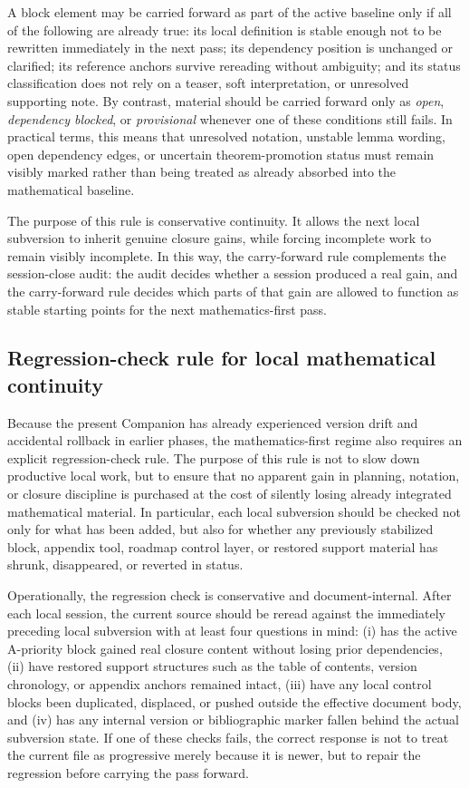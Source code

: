 A block element may be carried forward as part of the active baseline only if all of the following are already true: its local definition is stable enough not to be rewritten immediately in the next pass; its dependency position is unchanged or clarified; its reference anchors survive rereading without ambiguity; and its status classification does not rely on a teaser, soft interpretation, or unresolved supporting note. By contrast, material should be carried forward only as \emph{open}, \emph{dependency blocked}, or \emph{provisional} whenever one of these conditions still fails. In practical terms, this means that unresolved notation, unstable lemma wording, open dependency edges, or uncertain theorem-promotion status must remain visibly marked rather than being treated as already absorbed into the mathematical baseline.

The purpose of this rule is conservative continuity. It allows the next local subversion to inherit genuine closure gains, while forcing incomplete work to remain visibly incomplete. In this way, the carry-forward rule complements the session-close audit: the audit decides whether a session produced a real gain, and the carry-forward rule decides which parts of that gain are allowed to function as stable starting points for the next mathematics-first pass.


\subsection*{Regression-check rule for local mathematical continuity}
Because the present Companion has already experienced version drift and accidental rollback in earlier phases, the mathematics-first regime also requires an explicit regression-check rule. The purpose of this rule is not to slow down productive local work, but to ensure that no apparent gain in planning, notation, or closure discipline is purchased at the cost of silently losing already integrated mathematical material. In particular, each local subversion should be checked not only for what has been added, but also for whether any previously stabilized block, appendix tool, roadmap control layer, or restored support material has shrunk, disappeared, or reverted in status.

Operationally, the regression check is conservative and document-internal. After each local session, the current source should be reread against the immediately preceding local subversion with at least four questions in mind: (i) has the active A-priority block gained real closure content without losing prior dependencies, (ii) have restored support structures such as the table of contents, version chronology, or appendix anchors remained intact, (iii) have any local control blocks been duplicated, displaced, or pushed outside the effective document body, and (iv) has any internal version or bibliographic marker fallen behind the actual subversion state. If one of these checks fails, the correct response is not to treat the current file as progressive merely because it is newer, but to repair the regression before carrying the pass forward.

